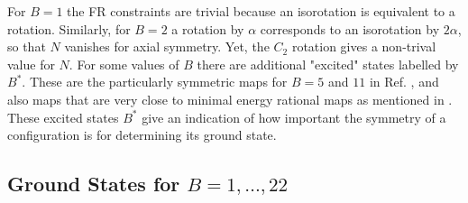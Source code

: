 \documentclass[a4paper,12pt]{article}
\begin{document}
For $B=1$ the FR constraints are trivial because an isorotation is 
equivalent to a rotation. Similarly, for $B=2$ a rotation by $\alpha$ 
corresponds to an isorotation by $2 \alpha$, so that $N$ vanishes for 
axial symmetry. Yet, the $C_2$ rotation gives a non-trival value for $N$.
For some values of $B$ there are additional "excited" states labelled 
by $B^*$. 
These are the particularly symmetric maps for $B=5$ and $11$ in 
Ref. \cite{Houghton:1998kg}, and also maps that are very close to minimal 
energy rational maps as mentioned in \cite{Battye:2001qn}. These excited 
states $B^*$ give an indication of how important the symmetry of a 
configuration is for determining its ground state.

\subsection{Ground States for $B=1, \dots, 22$}
\label{Groundstates}
\end{document}

